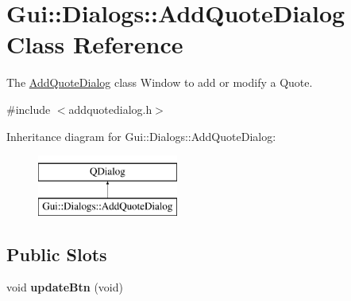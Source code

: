 \hypertarget{classGui_1_1Dialogs_1_1AddQuoteDialog}{\section{Gui\+:\+:Dialogs\+:\+:Add\+Quote\+Dialog Class Reference}
\label{classGui_1_1Dialogs_1_1AddQuoteDialog}
}


The \hyperlink{classGui_1_1Dialogs_1_1AddQuoteDialog}{Add\+Quote\+Dialog} class Window to add or modify a Quote.  




{\ttfamily \#include $<$addquotedialog.\+h$>$}

Inheritance diagram for Gui\+:\+:Dialogs\+:\+:Add\+Quote\+Dialog\+:\begin{figure}[H]
\begin{center}
\leavevmode
\includegraphics[height=2.000000cm]{d6/d43/classGui_1_1Dialogs_1_1AddQuoteDialog}
\end{center}
\end{figure}
\subsection*{Public Slots}
\begin{DoxyCompactItemize}
\item 
\hypertarget{classGui_1_1Dialogs_1_1AddQuoteDialog_a5fa7b833c2a4271cc637e7dd9ec72fff}{void {\bfseries update\+Btn} (void)}\label{classGui_1_1Dialogs_1_1AddQuoteDialog_a5fa7b833c2a4271cc637e7dd9ec72fff}

\end{DoxyCompactItemize}
